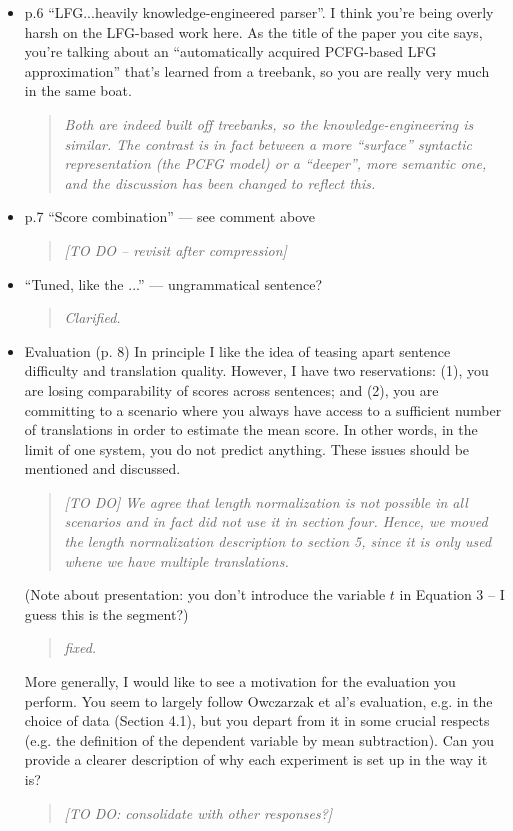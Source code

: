 \documentclass[letterpaper,12pt]{article}
\newenvironment{response}
{\begin{quotation} \it}
  {\end{quotation}}
\begin{document}
\begin{itemize}
\item  p.6 ``LFG...heavily knowledge-engineered parser''. I think you're
  being overly harsh on the LFG-based work here. As the title of the
  paper you cite says, you're talking about an ``automatically acquired
  PCFG-based LFG approximation'' that's learned from a treebank, so you
  are really very much in the same boat.
  \begin{response}
    Both are indeed built off treebanks, so the knowledge-engineering
    is similar. The contrast is in fact between a more ``surface''
    syntactic representation (the PCFG model) or a ``deeper'', more
    semantic one, and the discussion has been changed to reflect this.
  \end{response}

\item p.7 ``Score combination'' --- see comment above 
  \begin{response}
    [TO DO -- revisit after compression]
  \end{response}

\item ``Tuned, like the ...''  --- ungrammatical sentence?
  \begin{response}
    Clarified.
  \end{response}

\item  Evaluation (p. 8) In principle I like the idea of teasing apart
  sentence difficulty and translation quality. However, I have two
  reservations: (1), you are losing comparability of scores across
  sentences; and (2), you are committing to a scenario where you
  always have access to a sufficient number of translations in order
  to estimate the mean score. In other words, in the limit of one
  system, you do not predict anything.  These issues should be
  mentioned and discussed.  
  \begin{response}
    [TO DO] We agree that length normalization is not possible in all
    scenarios and in fact did not use it in section four.  Hence, we
    moved the length normalization description to section 5, since it
    is only used whene we have multiple translations.  
  \end{response}
  (Note about presentation: you don't
  introduce the variable $t$ in Equation 3 -- I guess this is the
  segment?)
  \begin{response}
    fixed.
  \end{response}
 
  More generally, I would like to see a motivation for the evaluation
  you perform. You seem to largely follow Owczarzak et al's
  evaluation, e.g. in the choice of data (Section 4.1), but you depart
  from it in some crucial respects (e.g. the definition of the
  dependent variable by mean subtraction). Can you provide a clearer
  description of why each experiment is set up in the way it is?
  \begin{response}
    [TO DO: consolidate with other responses?]


\end{response}
\end{itemize}
\end{document}
